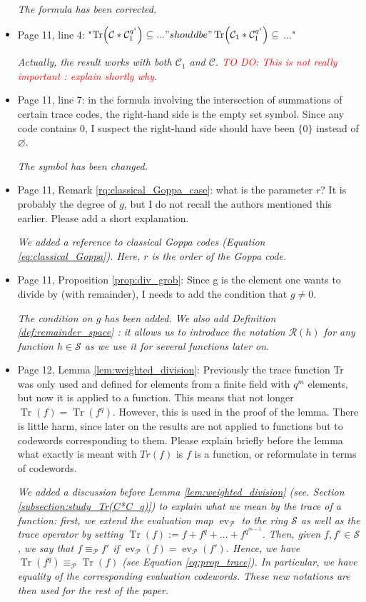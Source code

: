 \documentclass[12pt,a4paper]{amsart}
\newcommand\TODO[1]{\textcolor{red}{TO DO: #1}}
\DeclareMathOperator{\trace}{Tr}
\DeclareMathOperator{\ev}{ev}
\newcommand{\calC}{\mathcal{C}}
\newcommand{\calP}{\mathcal{P}}
\newcommand{\Tr}[1]{\trace\!\left(#1\right)}
\begin{document}
\begin{itemize}
\textit{The formula has been corrected.}

\item Page 11, line 4: "$\Tr{\calC*\calC_1^{q^i}} \subseteq ..." should be "\Tr{\calC_1*\calC_1^{q^i}} \subseteq$ ..."

\textit{Actually, the result works with both $\calC_1$ and $\calC$. \TODO{This is not really important : explain shortly why}.}

\item Page 11, line 7: in the formula involving the intersection of summations of certain trace codes, the right-hand side is the empty set symbol. Since any code contains 0, I suspect the right-hand side should have been $\{0\}$ instead of $\varnothing$.

\textit{The symbol has been changed.}

\item Page 11, Remark \ref{rq:classical_Goppa_case}: what is the parameter $r$? It is probably the degree of $g$, but I do not recall the authors mentioned this earlier. Please add a short explanation.

\textit{We added a reference to classical Goppa codes (Equation \eqref{eq:classical_Goppa}). Here, $r$ is the order of the Goppa code.} 

\item Page 11, Proposition \ref{prop:div_grob}: Since g is the element one wants to divide by (with remainder), I needs to add the condition that $g \neq 0$.

\textit{The condition on $g$ has been added. We also add Definition \ref{def:remainder_space} : it allows us to introduce the notation $\mathcal{R}(h)$ for any function $h \in \mathcal{S}$ as we use it for several functions later on.} 

\item Page 12, Lemma \ref{lem:weighted_division}: Previously the trace function Tr was only used and defined for elements from a finite field with $q^m$ elements, but now it is applied to a function. This means that not longer $\Tr{f}=\Tr{f^q}$. However, this is used in the proof of the lemma. There is little harm, since later on the results are not applied to functions but to codewords corresponding to them. Please explain briefly before the lemma what exactly is meant with $Tr(f)$ is $f$ is a function, or reformulate in terms of codewords.

\textit{We added a discussion before Lemma \ref{lem:weighted_division} (see. Section \ref{subsection:study_Tr(C*C_q)}) to explain what we mean by the trace of a function: first, we extend the evaluation map $\ev_{\calP}$ to the ring $\mathcal{S}$ as well as the trace operator by setting $\Tr{f}:=f+f^q+\dots + f^{q^{m-1}}$. Then, given $f,f' \in \mathcal{S}$, we say that $f \equiv_{\calP} f'$ if $\ev_{\calP}(f)=\ev_{\calP}(f')$. Hence, we have $\Tr{f^q} \equiv_{\calP}\Tr{f}$ (see Equation \eqref{eq:prop_trace}). In particular, we have equality of the corresponding evaluation codewords. These new notations are then used for the rest of the paper.}


\end{itemize}
\end{document}
